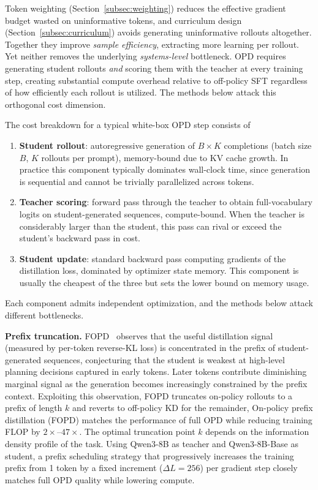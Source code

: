 \documentclass{article} %
\begin{document}
Token weighting (Section~\ref{subsec:weighting}) reduces the effective gradient budget wasted on uninformative tokens, and curriculum design (Section~\ref{subsec:curriculum}) avoids generating uninformative rollouts altogether. Together they improve \emph{sample efficiency}, extracting more learning per rollout. Yet neither removes the underlying \emph{systems-level} bottleneck. OPD requires generating student rollouts \emph{and} scoring them with the teacher at every training step, creating substantial compute overhead relative to off-policy SFT regardless of how efficiently each rollout is utilized. The methods below attack this orthogonal cost dimension.

The cost breakdown for a typical white-box OPD step consists of
\begin{enumerate}[nosep]
    \item \textbf{Student rollout}: autoregressive generation of $B \times K$ completions (batch size $B$, $K$ rollouts per prompt), memory-bound due to KV cache growth. In practice this component typically dominates wall-clock time, since generation is sequential and cannot be trivially parallelized across tokens.
    \item \textbf{Teacher scoring}: forward pass through the teacher to obtain full-vocabulary logits on student-generated sequences, compute-bound. When the teacher is considerably larger than the student, this pass can rival or exceed the student's backward pass in cost.
    \item \textbf{Student update}: standard backward pass computing gradients of the distillation loss, dominated by optimizer state memory. This component is usually the cheapest of the three but sets the lower bound on memory usage.
\end{enumerate}
Each component admits independent optimization, and the methods below attack different bottlenecks.

\textbf{Prefix truncation.} FOPD~\citep{2602.15260} observes that the useful distillation signal (measured by per-token reverse-KL loss) is concentrated in the prefix of student-generated sequences, conjecturing that the student is weakest at high-level planning decisions captured in early tokens. Later tokens contribute diminishing marginal signal as the generation becomes increasingly constrained by the prefix context. Exploiting this observation, FOPD truncates on-policy rollouts to a prefix of length $k$ and reverts to off-policy KD for the remainder, On-policy prefix distillation (FOPD) matches the performance of full OPD while reducing training FLOP by $2\times$--$47\times$. The optimal truncation point $k$ depends on the information density profile of the task. Using Qwen3-8B as teacher and Qwen3-8B-Base as student, a prefix scheduling strategy that progressively increases the training prefix from 1 token by a fixed increment ($\Delta L = 256$) per gradient step closely matches full OPD quality while lowering compute.
\end{document}
